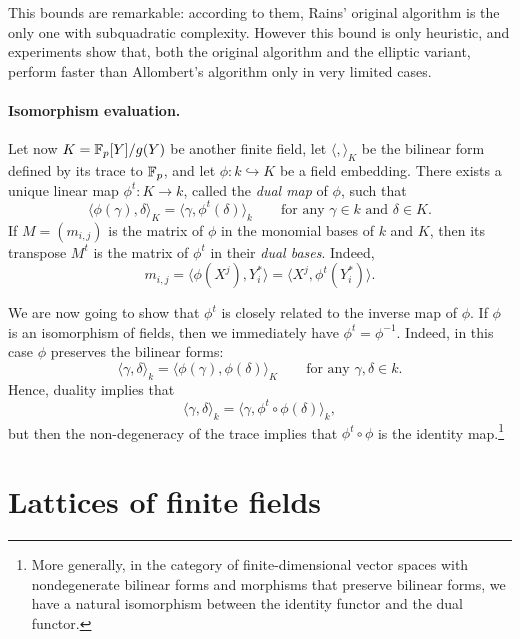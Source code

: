 \documentclass{report}
\theoremstyle{plain}
\theoremstyle{definition}
\begin{document}
This bounds are remarkable: according to them, Rains' original
algorithm is the only one with subquadratic complexity. %
However this bound is only heuristic, and experiments show that, both
the original algorithm and the elliptic variant, perform faster than
Allombert's algorithm only in very limited cases. %


\paragraph{Isomorphism evaluation.}
Let now $K=\mathbb{F}_p[Y]/g(Y)$ be another finite field, let $〈,〉_K$ be
the bilinear form defined by its trace to $\mathbb{F}_p$, and let
$\phi:k\hookrightarrow K$ be a field embedding. %
There exists a unique linear map $\phi^t:K\to k$, called the
\emph{dual map} of $\phi$, such that
\begin{equation*}
  〈ϕ(γ),δ〉_K=〈γ,ϕ^t(δ)〉_k
  \qquad\text{for any $γ∈k$ and $δ∈K$.}
\end{equation*}
If $M=(m_{i,j})$ is the matrix of $\phi$ in the monomial bases of $k$
and $K$, then its transpose $M^t$ is the matrix of $\phi^t$ in their
\emph{dual bases}. %
Indeed,
\begin{equation}
  \label{eq:tellegen-matrix}
  m_{i,j} = 〈ϕ(X^j),Y_i^*〉 = 〈X^j,ϕ^t(Y_i^*)〉.
\end{equation}

We are now going to show that $\phi^t$ is closely related to the
inverse map of $\phi$. %
If $\phi$ is an isomorphism of fields, then we immediately have
$\phi^t=\phi^{-1}$. %
Indeed, in this case $\phi$ preserves the bilinear forms:
\begin{equation*}
  〈γ,δ〉_k = 〈ϕ(γ),ϕ(δ)〉_K
  \qquad\text{for any $γ,δ∈k$.}
\end{equation*}
Hence, duality implies that
\begin{equation*}
  〈γ,δ〉_k = 〈γ,ϕ^t∘ϕ(δ)〉_k,
\end{equation*}
but then the non-degeneracy of the trace implies that
$\phi^t\circ\phi$ is the identity map.\footnote{More generally, in the
  category of finite-dimensional vector spaces with nondegenerate
  bilinear forms and morphisms that preserve bilinear forms, we have a
  natural isomorphism between the identity functor and the dual
  functor.}




\section{Lattices of finite fields}
\end{document}
